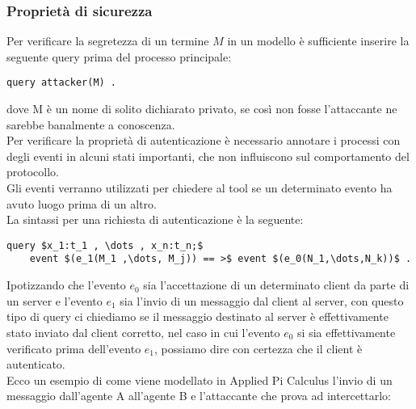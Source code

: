\subsubsection*{Proprietà di sicurezza}
Per verificare la segretezza di un termine $M$ in un modello è sufficiente inserire la seguente query prima del processo principale:
\begin{lstlisting}[language=app]
    query attacker(M) .
\end{lstlisting} 
dove M è un nome di solito dichiarato privato, se così non fosse l'attaccante ne sarebbe banalmente a conoscenza.\\
Per verificare la proprietà di autenticazione è necessario annotare i processi con degli eventi in alcuni stati importanti, che non influiscono sul comportamento del protocollo.\\
Gli eventi verranno utilizzati per chiedere al tool se un determinato evento ha avuto luogo prima di un altro.\\
La sintassi per una richiesta di autenticazione è la seguente:
\begin{lstlisting}[language=app, mathescape]
    query $x_1:t_1 , \dots , x_n:t_n;$ 
    event $(e_1(M_1 ,\dots, M_j)) == >$ event $(e_0(N_1,\dots,N_k))$ .
\end{lstlisting} 
Ipotizzando che l'evento $e_0$ sia l'accettazione di un determinato client da parte di un server e l'evento $e_1$ sia l'invio di un messaggio dal client al server, con questo tipo di query ci chiediamo se il messaggio destinato al server è effettivamente stato inviato dal client corretto, nel caso in cui l'evento $e_0$ si sia effettivamente verificato prima dell'evento $e_1$, possiamo dire con certezza che il client è autenticato.\\
\noindent Ecco un esempio di come viene modellato in Applied Pi Calculus l'invio di un messaggio dall'agente A all'agente B e l'attaccante che prova ad intercettarlo:

